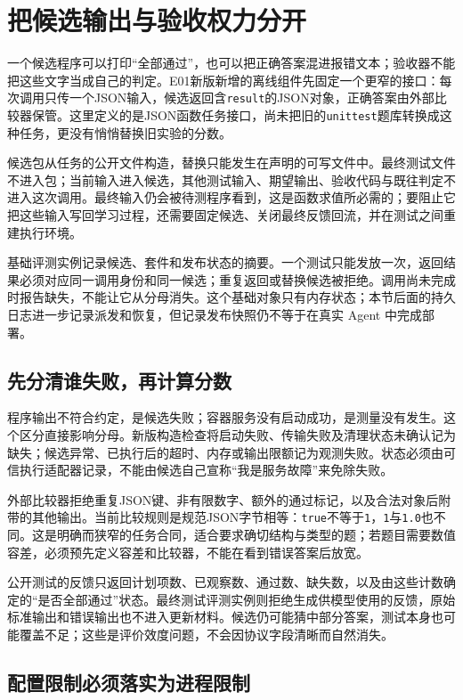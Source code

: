 \section{把候选输出与验收权力分开}
\label{sec:appb-separate-oracle}

一个候选程序可以打印“全部通过”，也可以把正确答案混进报错文本；验收器不能把这些文字当成自己的判定。E01新版新增的离线组件先固定一个更窄的接口：每次调用只传一个JSON输入，候选返回含\texttt{result}的JSON对象，正确答案由外部比较器保管。这里定义的是JSON函数任务接口，尚未把旧的\texttt{unittest}题库转换成这种任务，更没有悄悄替换旧实验的分数。

候选包从任务的公开文件构造，替换只能发生在声明的可写文件中。最终测试文件不进入包；当前输入进入候选，其他测试输入、期望输出、验收代码与既往判定不进入这次调用。最终输入仍会被待测程序看到，这是函数求值所必需的；要阻止它把这些输入写回学习过程，还需要固定候选、关闭最终反馈回流，并在测试之间重建执行环境。

基础评测实例记录候选、套件和发布状态的摘要。一个测试只能发放一次，返回结果必须对应同一调用身份和同一候选；重复返回或替换候选被拒绝。调用尚未完成时报告缺失，不能让它从分母消失。这个基础对象只有内存状态；本节后面的持久日志进一步记录派发和恢复，但记录发布快照仍不等于在真实 Agent 中完成部署。

\subsection{先分清谁失败，再计算分数}

程序输出不符合约定，是候选失败；容器服务没有启动成功，是测量没有发生。这个区分直接影响分母。新版构造检查将启动失败、传输失败及清理状态未确认记为缺失；候选异常、已执行后的超时、内存或输出限额记为观测失败。状态必须由可信执行适配器记录，不能由候选自己宣称“我是服务故障”来免除失败。

外部比较器拒绝重复JSON键、非有限数字、额外的通过标记，以及合法对象后附带的其他输出。当前比较规则是规范JSON字节相等：\texttt{true}不等于\texttt{1}，\texttt{1}与\texttt{1.0}也不同。这是明确而狭窄的任务合同，适合要求确切结构与类型的题；若题目需要数值容差，必须预先定义容差和比较器，不能在看到错误答案后放宽。

公开测试的反馈只返回计划项数、已观察数、通过数、缺失数，以及由这些计数确定的“是否全部通过”状态。最终测试评测实例则拒绝生成供模型使用的反馈，原始标准输出和错误输出也不进入更新材料。候选仍可能猜中部分答案，测试本身也可能覆盖不足；这些是评价效度问题，不会因协议字段清晰而自然消失。

\subsection{配置限制必须落实为进程限制}

